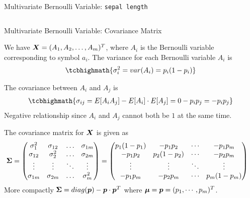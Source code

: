 \begin{frame}{Multivariate Bernoulli Variable: {\tt sepal length}}
\begin{columns}
\end{columns}
\end{frame}


\begin{frame}{Multivariate Bernoulli Variable: Covariance Matrix}
  \small

  We have
${\boldsymbol X} = (A_1, A_2, \dots, A_m)^T$, where $A_i$ is the
Bernoulli variable corresponding to symbol $a_i$. 
The variance for 
each Bernoulli variable $A_i$ is
\begin{align*}
\tcbhighmath{
    \sigma_i^2 = var(A_i) = p_i(1-p_i)
}
\end{align*}

The covariance between $A_i$ and $A_{j}$ is
\begin{align*}
\tcbhighmath{
    \sigma_{ij} = E[A_i A_{j}] - E[A_i]\cdot E[A_{j}] = 0 - p_i p_{j}
    = -p_i p_{j}
}
\end{align*}
Negative relationship since
$A_i$ and $A_{j}$ cannot both be $1$ at the same time.

The covariance matrix for ${\boldsymbol X}$ is given as
\begin{align*}
    \cov =
    \matr{
        \sigma_1^2 & \sigma_{12} & \dots & \sigma_{1m}\\
        \sigma_{12} & \sigma_{2}^2 & \dots & \sigma_{2m}\\
        \vdots & \vdots & \ddots & \vdots\\
        \sigma_{1m} & \sigma_{2m} & \dots & \sigma_{m}^2\\
    }
    & =
    \amatr{c}{p_1(1-p_1) & -p_1p_2 & \cdots & -p_1p_m\\
    -p_1p_2 & p_2(1-p_2) & \cdots & -p_2p_m\\
    \vdots & \vdots & \ddots & \vdots\\
    -p_1p_m & -p_2p_m & \cdots & p_m(1-p_m)\\
    }
\end{align*}
More compactly ${\bm \Sigma} =diag({\boldsymbol p}) - {\boldsymbol p} \cdot {\boldsymbol p}^T$
where ${\bm \mu} = {\boldsymbol p} = (p_1, \cdots, p_m)^T$.
\end{frame}


